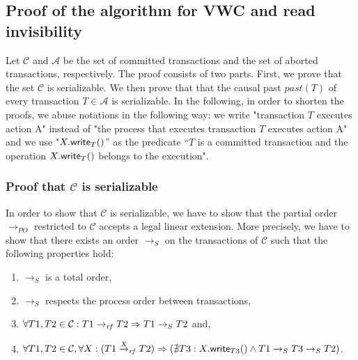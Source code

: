 


\subsection{Proof of the algorithm for VWC and read invisibility}
\label{sec:algorithm-V1-proof}


Let  $\mathcal{C}$ and   $\mathcal{A}$ be the set  of committed transactions 
and the set  of aborted transactions, respectively. 
The proof consists of two parts. First, we prove that the set $\mathcal{C}$
is serializable. We then prove that that the causal past $\mathit{past(T)}$
of every transaction $T \in  \mathcal{A}$ is serializable. 
In the following, in order to shorten the proofs, 
we  abuse notations in the following way: we write "transaction $T$
executes action A" instead of "the process that executes transaction 
$T$ executes action A"  and we use "$X.{\sf write}_T()$'' as the predicate
``$T$  is a  committed  transaction and  the  operation $X.{\sf  write}_T()$
belongs to the execution".  



\subsubsection{Proof that $\mathcal{C}$ is serializable}
In order to show that $\mathcal{C}$ is serializable, we have to show that 
the partial order $\rightarrow_{PO}$ restricted to
$\mathcal{C}$ accepts a legal linear extension. More precisely, we have 
to show that there exists an order $\rightarrow_S$ on the transactions
of $\mathcal{C}$ such that the following properties hold:
\begin{enumerate}
\vspace{-0.2cm}
\item $\rightarrow_S$ is a total order,
\vspace{-0.2cm}
\item $\rightarrow_S$ respects the process order between transactions,
\vspace{-0.2cm}
\item $\forall T1, T2 \in \mathcal{C}: 
T1 \stackrel{}{\rightarrow}_{\mathit{rf}} T2 \Rightarrow T1 \rightarrow_S T2$ and,
\vspace{-0.2cm}
\item $\forall T1, T2 \in \mathcal{C}, \forall X: (T1 \stackrel{X}{\rightarrow}_{\mathit{rf}} T2)
\Rightarrow (\nexists T3: X.{\sf write}_{T3}() 
       \wedge T1 \rightarrow_S T3 \rightarrow_S T2)$.
\end{enumerate}

